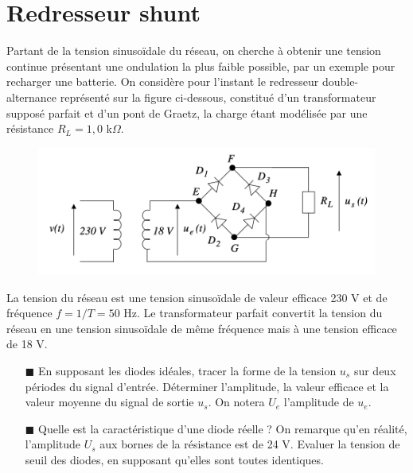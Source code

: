 \documentclass{report}
\begin{document}
\newpage

\section*{Redresseur shunt}

Partant de la tension sinusoïdale du réseau, on cherche à obtenir une tension continue présentant une ondulation la plus faible possible, par un exemple pour recharger une batterie. On considère pour l'instant le redresseur double-alternance représenté sur la figure ci-dessous, constitué d'un transformateur supposé parfait et d'un pont de Graetz, la charge étant modélisée par une résistance $R_L=1,0$ k$\Omega$. 

\begin{figure}[h!]
	\centering
		\includegraphics[scale=0.7]{circuit2_1.png}
\end{figure}	

La tension du réseau est une tension sinusoïdale de valeur efficace 230 V et de fréquence $f=1/T=50$ Hz. Le transformateur parfait convertit la tension du réseau en une tension sinusoïdale de même fréquence mais à une tension efficace de 18 V.

\begin{itemize}

	\item[$\blacksquare$] En supposant les diodes idéales, tracer la forme de la tension $u_s$ sur deux périodes du signal d'entrée. Déterminer l'amplitude, la valeur efficace et la valeur moyenne du signal de sortie $u_s$. On notera $U_e$ l'amplitude de $u_e$.
	
	\item[$\blacksquare$] Quelle est la caractéristique d'une diode réelle ? On remarque qu'en réalité, l'amplitude $U_s$ aux bornes de la résistance est de 24 V. Evaluer la tension de seuil des diodes, en supposant qu'elles sont toutes identiques. 

\end{itemize}
\end{document}
